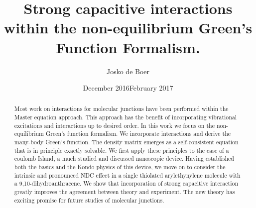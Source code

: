 \documentclass{article}
\title{Strong capacitive interactions within the non-equilibrium Green's Function Formalism.}
\author{Josko de Boer}
\date{December 2016}
\date{February 2017}
\begin{document}
\maketitle
\begin{abstract}
    Most work on interactions for molecular junctions have been performed within the Master equation approach. This approach has the benefit of incorporating vibrational excitations and interactions up to desired order. In this work we focus on the non-equilibrium Green's function formalism. We incorporate interactions and derive the many-body Green's function. The density matrix emerges as a self-consistent equation that is in principle exactly solvable. We first apply these principles to the case of a coulomb Island, a much studied and discussed nanoscopic device.  Having established both the basics and the Kondo physics of this device, we move on to consider the intrinsic and pronounced NDC effect in a single thiolated arylethynylene molecule with a 9,10-dihydroanthracene. We show that incorporation of strong capacitive interaction greatly improves the agreement between theory and experiment. The new theory has exciting promise for future studies of molecular junctions.
\end{abstract}
\end{document}
